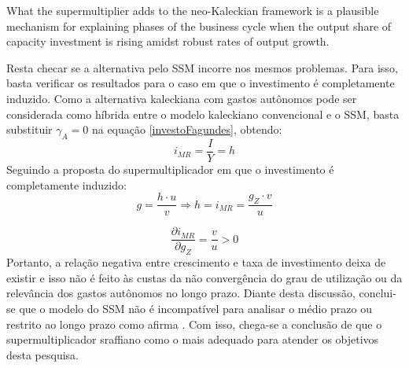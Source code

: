 \begin{citacao}
	What the supermultiplier adds to the neo-Kaleckian framework is a plausible mechanism for explaining phases
	of the business cycle when the output share of capacity investment is rising amidst robust rates of output growth. \cite[p.~9]{fiebiger_trend_2017}
\end{citacao}

Resta checar se a alternativa pelo SSM incorre nos mesmos problemas. Para isso, basta verificar os resultados para o caso em que o investimento é completamente induzido. Como a alternativa kaleckiana com gastos autônomos pode ser considerada como híbrida entre o modelo kaleckiano convencional e o SSM, basta substituir $\gamma_A = 0$ na equação \ref{investoFagundes}, obtendo:
$$
i_{MR} = \frac{I}{Y} =  h
$$
Seguindo a proposta do supermultiplicador em que o investimento é completamente induzido:
$$
g = \frac{h\cdot u}{v} \Rightarrow h = i_{MR} = \frac{g_Z\cdot v}{u}
$$

$$
\frac{\partial i_{MR}}{\partial g_Z} = \frac{v}{u} > 0
$$
Portanto, a relação negativa entre crescimento e taxa de investimento deixa de existir e isso não é feito às custas da não convergência do grau de utilização ou da relevância dos gastos autônomos no longo prazo. 
Diante desta discussão, conclui-se que o modelo do SSM não é incompatível para analisar o médio prazo ou restrito ao longo prazo como afirma \textcite{nikiforos_comments_2018}. Com isso, chega-se a conclusão de que o supermultiplicador sraffiano como o mais adequado para atender os objetivos desta pesquisa. 





